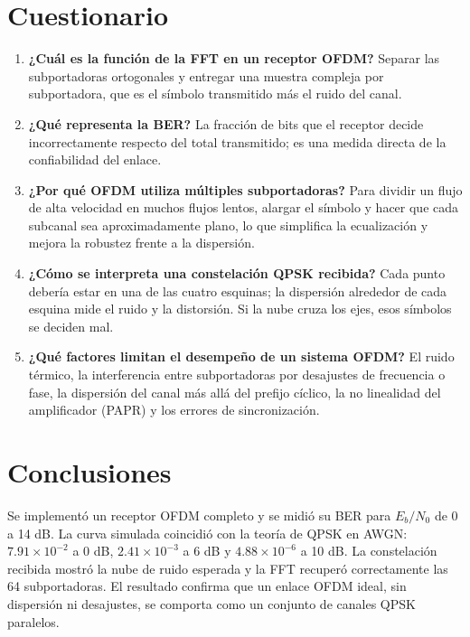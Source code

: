 \documentclass[11pt,a4paper]{article}
\begin{document}
\section{Cuestionario}

\begin{enumerate}
  \item \textbf{¿Cuál es la función de la FFT en un receptor OFDM?} Separar las
        subportadoras ortogonales y entregar una muestra compleja por subportadora, que es
        el símbolo transmitido más el ruido del canal.
  \item \textbf{¿Qué representa la BER?} La fracción de bits que el receptor decide
        incorrectamente respecto del total transmitido; es una medida directa de la
        confiabilidad del enlace.
  \item \textbf{¿Por qué OFDM utiliza múltiples subportadoras?} Para dividir un flujo de
        alta velocidad en muchos flujos lentos, alargar el símbolo y hacer que cada
        subcanal sea aproximadamente plano, lo que simplifica la ecualización y mejora la
        robustez frente a la dispersión.
  \item \textbf{¿Cómo se interpreta una constelación QPSK recibida?} Cada punto debería
        estar en una de las cuatro esquinas; la dispersión alrededor de cada esquina mide
        el ruido y la distorsión. Si la nube cruza los ejes, esos símbolos se deciden mal.
  \item \textbf{¿Qué factores limitan el desempeño de un sistema OFDM?} El ruido térmico,
        la interferencia entre subportadoras por desajustes de frecuencia o fase, la
        dispersión del canal más allá del prefijo cíclico, la no linealidad del amplificador
        (PAPR) y los errores de sincronización.
\end{enumerate}

\section{Conclusiones}

Se implementó un receptor OFDM completo y se midió su BER para $E_b/N_0$ de 0 a 14 dB. La
curva simulada coincidió con la teoría de QPSK en AWGN: $7.91\times10^{-2}$ a 0 dB,
$2.41\times10^{-3}$ a 6 dB y $4.88\times10^{-6}$ a 10 dB. La constelación recibida mostró
la nube de ruido esperada y la FFT recuperó correctamente las 64 subportadoras. El
resultado confirma que un enlace OFDM ideal, sin dispersión ni desajustes, se comporta
como un conjunto de canales QPSK paralelos.
\end{document}

